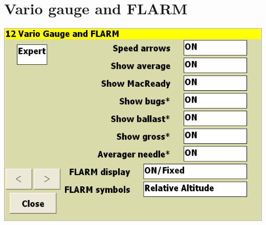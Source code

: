 \documentclass[a4paper,12pt]{refrep}
\begin{document}

\clearpage
\section{Vario gauge and FLARM}\label{sec:vario-gauge}

\begin{center}
\includegraphics[angle=0,width=\linewidth,keepaspectratio='true']{figures/config-10.png}
\end{center}
\end{document}
